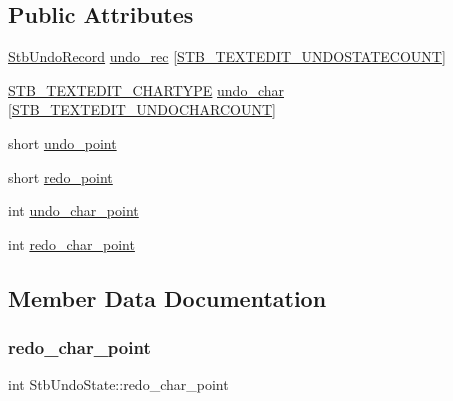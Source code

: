 \subsection*{Public Attributes}
\begin{DoxyCompactItemize}
\item 
\mbox{\hyperlink{struct_stb_undo_record}{Stb\+Undo\+Record}} \mbox{\hyperlink{struct_stb_undo_state_a8cb07be8f304d1620b50bd024709023f}{undo\+\_\+rec}} \mbox{[}\mbox{\hyperlink{imstb__textedit_8h_afa79483143df87a1497010712b3dfaf9}{S\+T\+B\+\_\+\+T\+E\+X\+T\+E\+D\+I\+T\+\_\+\+U\+N\+D\+O\+S\+T\+A\+T\+E\+C\+O\+U\+NT}}\mbox{]}
\item 
\mbox{\hyperlink{imstb__textedit_8h_a6e64031a061922e3a48d88fd8623f4c3}{S\+T\+B\+\_\+\+T\+E\+X\+T\+E\+D\+I\+T\+\_\+\+C\+H\+A\+R\+T\+Y\+PE}} \mbox{\hyperlink{struct_stb_undo_state_a88320a054aaf18ca122c2b23903a8677}{undo\+\_\+char}} \mbox{[}\mbox{\hyperlink{imstb__textedit_8h_a15cbcac55cf92003c28c44734422756a}{S\+T\+B\+\_\+\+T\+E\+X\+T\+E\+D\+I\+T\+\_\+\+U\+N\+D\+O\+C\+H\+A\+R\+C\+O\+U\+NT}}\mbox{]}
\item 
short \mbox{\hyperlink{struct_stb_undo_state_ad29a8695b3e8252ac164d0c2d0be7d7c}{undo\+\_\+point}}
\item 
short \mbox{\hyperlink{struct_stb_undo_state_a719ba014b2db8a8ea55739664b445af0}{redo\+\_\+point}}
\item 
int \mbox{\hyperlink{struct_stb_undo_state_a1e93b8c26a8a23536921d125aceacd06}{undo\+\_\+char\+\_\+point}}
\item 
int \mbox{\hyperlink{struct_stb_undo_state_aab6e5eeb964882e6d9f5d2952b7352e3}{redo\+\_\+char\+\_\+point}}
\end{DoxyCompactItemize}


\subsection{Member Data Documentation}
\mbox{\label{struct_stb_undo_state_aab6e5eeb964882e6d9f5d2952b7352e3}} 
\subsubsection{\texorpdfstring{redo\+\_\+char\+\_\+point}{redo\_char\_point}}
{\footnotesize\ttfamily int Stb\+Undo\+State\+::redo\+\_\+char\+\_\+point}

